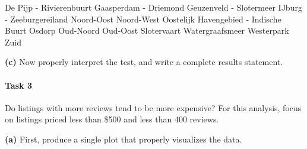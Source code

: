 \documentclass[
]{book}
\newenvironment{Shaded}{\begin{snugshade}}{\end{snugshade}}
\newcommand{\NormalTok}[1]{#1}
\newcommand{\SpecialCharTok}[1]{\textcolor[rgb]{0.00,0.00,0.00}{#1}}
\begin{document}
\begin{Shaded}
\begin{Highlighting}[]
\NormalTok{  De Pijp }\SpecialCharTok{{-}}\NormalTok{ Rivierenbuurt                                        }
\NormalTok{  Gaasperdam }\SpecialCharTok{{-}}\NormalTok{ Driemond                                          }
\NormalTok{  Geuzenveld }\SpecialCharTok{{-}}\NormalTok{ Slotermeer                                        }
\NormalTok{  IJburg }\SpecialCharTok{{-}}\NormalTok{ Zeeburgereiland                                       }
\NormalTok{  Noord}\SpecialCharTok{{-}}\NormalTok{Oost                                                     }
\NormalTok{  Noord}\SpecialCharTok{{-}}\NormalTok{West                                                     }
\NormalTok{  Oostelijk Havengebied }\SpecialCharTok{{-}}\NormalTok{ Indische Buurt                         }
\NormalTok{  Osdorp                                                         }
\NormalTok{  Oud}\SpecialCharTok{{-}}\NormalTok{Noord                                                      }
\NormalTok{  Oud}\SpecialCharTok{{-}}\NormalTok{Oost                                                       }
\NormalTok{  Slotervaart                                                    }
\NormalTok{  Watergraafsmeer                                                }
\NormalTok{  Westerpark                                                     }
\NormalTok{  Zuid                                                           }
\end{Highlighting}
\end{Shaded}

\textbf{(c)} Now properly interpret the test, and write a complete results statement.

\hypertarget{task-3-1}{%
\paragraph*{Task 3}\label{task-3-1}}

Do listings with more reviews tend to be more expensive? For this analysis, focus on listings priced less than \$500 and less than 400 reviews.

\textbf{(a)} First, produce a single plot that properly visualizes the data.
\end{document}
